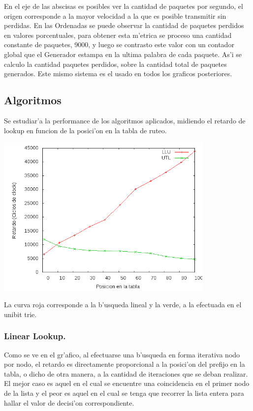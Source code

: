 \documentclass[12pt,spanish]{article}
\begin{document}
En el eje de las abscisas es posibles ver la cantidad de paquetes por segundo, el origen corresponde a la mayor velocidad a la que es posible transmitir sin perdidas. En las Ordenadas se puede observar la cantidad de paquetes perdidos en valores porcentuales, para obtener esta m'etrica se proceso una cantidad constante de paquetes, 9000, y luego se contrasto este valor con un contador global que el Generador estampa en la ultima palabra de cada paquete. As'i se calculo la cantidad paquetes perdidos, sobre la cantidad total de paquetes generados. Este mismo sistema es el usado en todos los graficos posteriores.

\subsection*{Algoritmos}

Se estudiar'a la performance de los algoritmos aplicados, midiendo el retardo de lookup en funcion de la posici'on en la tabla de ruteo.

\begin{center}
	\includegraphics[width=0.8\textwidth]{graf/llu-utlsof.png}
\end{center}

La curva roja corresponde a la b'usqueda lineal y la verde, a la efectuada en el unibit trie.

\subsubsection*{Linear Lookup.}

Como se ve en el gr'afico, al efectuarse una b'usqueda en forma iterativa nodo por nodo, el retardo es directamente proporcional a la posici'on del prefijo en la tabla, o dicho de otra manera, a la cantidad de iteraciones que se deban realizar. El mejor caso es aquel en el cual se encuentre una coincidencia en el primer nodo de la lista y el peor es aquel en el cual se tenga que recorrer la lista entera para hallar el valor de decisi'on correspondiente.
\end{document}
